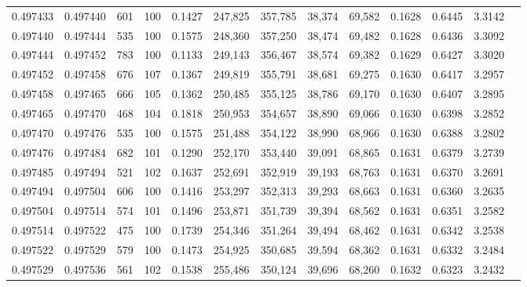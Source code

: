 \begin{tabular}{rrrrrrrrrrrrr}
0.497433 & 0.497440 &   601 & 100 &                                     0.1427 & 247,825 & 357,785 &  38,374 &  69,582 & 0.1628 & 0.6445 & 3.3142 \\
0.497440 & 0.497444 &   535 & 100 &                                     0.1575 & 248,360 & 357,250 &  38,474 &  69,482 & 0.1628 & 0.6436 & 3.3092 \\
0.497444 & 0.497452 &   783 & 100 &                                     0.1133 & 249,143 & 356,467 &  38,574 &  69,382 & 0.1629 & 0.6427 & 3.3020 \\
0.497452 & 0.497458 &   676 & 107 &                                     0.1367 & 249,819 & 355,791 &  38,681 &  69,275 & 0.1630 & 0.6417 & 3.2957 \\
0.497458 & 0.497465 &   666 & 105 &                                     0.1362 & 250,485 & 355,125 &  38,786 &  69,170 & 0.1630 & 0.6407 & 3.2895 \\
0.497465 & 0.497470 &   468 & 104 &                                     0.1818 & 250,953 & 354,657 &  38,890 &  69,066 & 0.1630 & 0.6398 & 3.2852 \\
0.497470 & 0.497476 &   535 & 100 &                                     0.1575 & 251,488 & 354,122 &  38,990 &  68,966 & 0.1630 & 0.6388 & 3.2802 \\
0.497476 & 0.497484 &   682 & 101 &                                     0.1290 & 252,170 & 353,440 &  39,091 &  68,865 & 0.1631 & 0.6379 & 3.2739 \\
0.497485 & 0.497494 &   521 & 102 &                                     0.1637 & 252,691 & 352,919 &  39,193 &  68,763 & 0.1631 & 0.6370 & 3.2691 \\
0.497494 & 0.497504 &   606 & 100 &                                     0.1416 & 253,297 & 352,313 &  39,293 &  68,663 & 0.1631 & 0.6360 & 3.2635 \\
0.497504 & 0.497514 &   574 & 101 &                                     0.1496 & 253,871 & 351,739 &  39,394 &  68,562 & 0.1631 & 0.6351 & 3.2582 \\
0.497514 & 0.497522 &   475 & 100 &                                     0.1739 & 254,346 & 351,264 &  39,494 &  68,462 & 0.1631 & 0.6342 & 3.2538 \\
0.497522 & 0.497529 &   579 & 100 &                                     0.1473 & 254,925 & 350,685 &  39,594 &  68,362 & 0.1631 & 0.6332 & 3.2484 \\
0.497529 & 0.497536 &   561 & 102 &                                     0.1538 & 255,486 & 350,124 &  39,696 &  68,260 & 0.1632 & 0.6323 & 3.2432 \\

\end{tabular}
